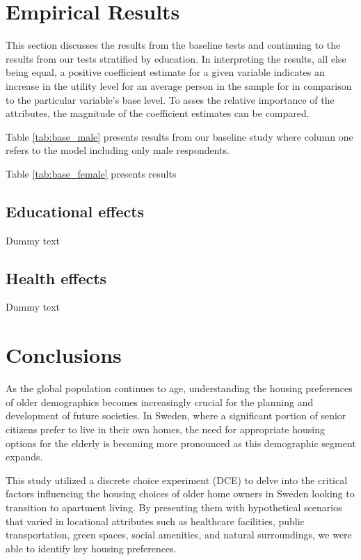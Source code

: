 \documentclass[3p,12pt ]{elsarticle}
\begin{document}


\clearpage

\section{Empirical Results}

This section discusses the results from the baseline tests and continuing to the results from our tests stratified by education.
In interpreting the results,
all else being equal, 
a positive coefficient estimate for a given variable indicates an increase in the utility level for an average person in the sample for in comparison to the particular variable's base level.
To asses the relative importance of the attributes,
the magnitude of the coefficient estimates can be compared.

Table \ref{tab:base_male} presents results from our baseline study where column one refers to the model including only male respondents.




Table \ref{tab:base_female} presents results




\clearpage

\subsection{Educational effects}
Dummy text
\lipsum[2-4]

\subsection{Health effects}

Dummy text
\lipsum[2-4]

\section{Conclusions}

As the global population continues to age, understanding the housing preferences of older demographics becomes increasingly crucial for the planning and development of future societies. In Sweden, where a significant portion of senior citizens prefer to live in their own homes, the need for appropriate housing options for the elderly is becoming more pronounced as this demographic segment expands. 

This study utilized a discrete choice experiment (DCE) to delve into the critical factors influencing the housing choices of older home owners in Sweden looking to transition to apartment living.
By presenting them with hypothetical scenarios that varied in locational attributes such as healthcare facilities, public transportation, green spaces, social amenities, and natural surroundings, we were able to identify key housing preferences.
\end{document}
